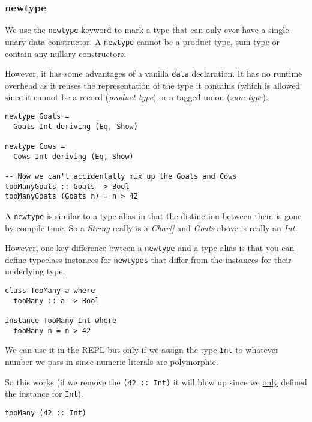 

\subsubsection{newtype}

We use the \texttt{newtype} keyword to mark a type that can only ever have a single unary data constructor.
A \texttt{newtype} cannot be a product type, sum type or contain any nullary constructors.

However, it has some advantages of a vanilla \texttt{data} declaration. It has no runtime overhead as
it reuses the representation of the type it contains (which is allowed since it cannot be a record (\emph{product type})
or a tagged union (\emph{sum type}).

\begin{lstlisting}
newtype Goats = 
  Goats Int deriving (Eq, Show)

newtype Cows =
  Cows Int deriving (Eq, Show)

-- Now we can't accidentally mix up the Goats and Cows
tooManyGoats :: Goats -> Bool
tooManyGoats (Goats n) = n > 42
\end{lstlisting}

A \texttt{newtype} is similar to a type alias in that the distinction between them is gone by compile time.
So a \emph{String} really is a \emph{Char[]} and \emph{Goats} above is really an \emph{Int}.

However, one key difference bwteen a \texttt{newtype} and a type alias is that you can define typeclass
instances for \texttt{newtypes} that \underline{differ} from the instances for their underlying type.

\begin{lstlisting}
class TooMany a where
  tooMany :: a -> Bool

instance TooMany Int where
  tooMany n = n > 42
\end{lstlisting}

We can use it in the REPL but \underline{only} if we assign the type \texttt{Int} to whatever
number we pass in since numeric literals are polymorphic.

So this works (if we remove the \texttt{(42 :: Int)} it will blow up since we \underline{only} defined the instance
for \texttt{Int}).
\begin{verbatim}
tooMany (42 :: Int)
\end{verbatim}

